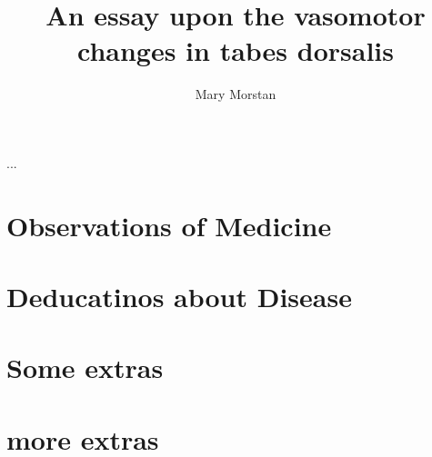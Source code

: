 \documentclass{maine-thesis}  %
\title{An essay upon the vasomotor changes in tabes dorsalis}					%
\author{Mary Morstan}					%
\begin{document}
\preliminary
\titlepage

\begin{abstract}
\Blindtext
\end{abstract}

\begin{layabstract}{...}	%
\blindtext
\end{layabstract}

\tableofcontents
\listoftables				%
\listoffigures				%

\mainmatter


\chapter{Observations of Medicine}
\blindtext

\chapter{Deducatinos about Disease}
\blindtext

\appendix					%
\chapter{Some extras}
\blindtext
\chapter{more extras}
\blindtext
\end{document}
